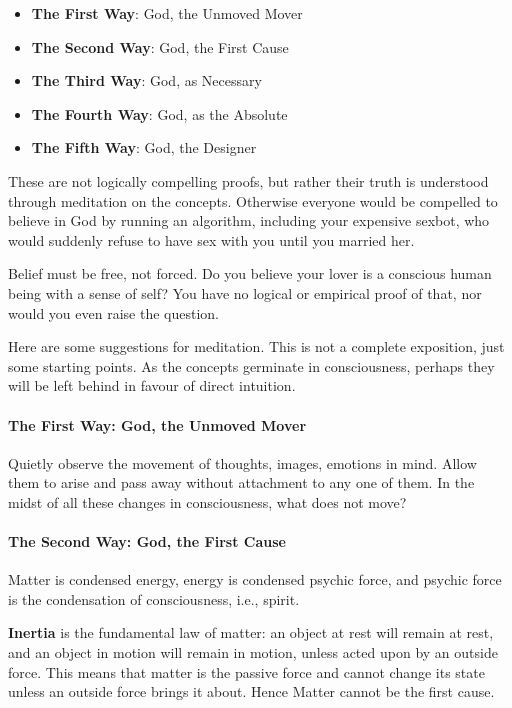 \begin{itemize}
\item \textbf{The First Way}: God, the Unmoved Mover 
\item \textbf{The Second Way}: God, the First Cause 
\item \textbf{The Third Way}: God, as Necessary 
\item \textbf{The Fourth Way}: God, as the Absolute 
\item \textbf{The Fifth Way}: God, the Designer 
\end{itemize}
These are not logically compelling proofs, but rather their truth is understood through meditation on the concepts. Otherwise everyone would be compelled to believe in God by running an algorithm, including your expensive sexbot, who would suddenly refuse to have sex with you until you married her.

Belief must be free, not forced. Do you believe your lover is a conscious human being with a sense of self? You have no logical or empirical proof of that, nor would you even raise the question.

Here are some suggestions for meditation. This is not a complete exposition, just some starting points. As the concepts germinate in consciousness, perhaps they will be left behind in favour of direct intuition.

\paragraph{The First Way: God, the Unmoved Mover}
Quietly observe the movement of thoughts, images, emotions in mind. Allow them to arise and pass away without attachment to any one of them. In the midst of all these changes in consciousness, what does not move?

\paragraph{The Second Way: God, the First Cause}

\begin{quotex}
Matter is condensed energy, energy is condensed psychic force, and psychic force is the condensation of consciousness, i.e., spirit. 
\end{quotex}

\textbf{Inertia} is the fundamental law of matter: an object at rest will remain at rest, and an object in motion will remain in motion, unless acted upon by an outside force. This means that matter is the passive force and cannot change its state unless an outside force brings it about. Hence Matter cannot be the first cause.

